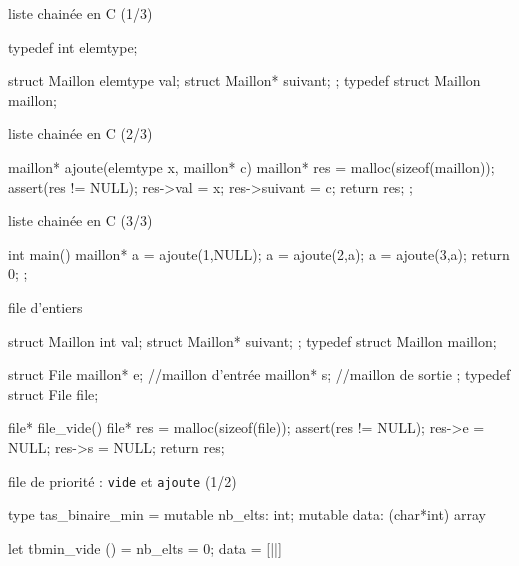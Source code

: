 \begin{adjustwidth}{-3cm}{-3cm}
\begin{implementation}{liste chainée en C (1/3)}
    \begin{lstC}
    typedef int elemtype;

    struct Maillon{
        elemtype val;
        struct Maillon* suivant;
    };
    typedef struct Maillon maillon;

    \end{lstC}
\end{implementation}

\begin{implementation}{liste chainée en C (2/3)}
    \begin{lstC}
    maillon* ajoute(elemtype x, maillon* c){
        maillon* res = malloc(sizeof(maillon));
        assert(res != NULL);
        res->val = x;
        res->suivant = c;
        return res;
    };
    \end{lstC}
\end{implementation}

\begin{implementation}{liste chainée en C (3/3)}
    \begin{lstC}
    int main(){
        maillon* a = ajoute(1,NULL);
        a = ajoute(2,a);
        a = ajoute(3,a);
        return 0;
    };
    \end{lstC}
\end{implementation}

\begin{implementation}{file d'entiers}
    \begin{lstC}
    struct Maillon{
        int val;
        struct Maillon* suivant;
    };
    typedef struct Maillon maillon;

    struct File{
        maillon* e; //maillon d'entrée
        maillon* s; //maillon de sortie
    };
    typedef struct File file;

    file* file_vide(){
        file* res = malloc(sizeof(file));
        assert(res != NULL);
        res->e = NULL;
        res->s = NULL;
        return res;
    }
    \end{lstC}
\end{implementation}

\begin{implementation}{file de priorité : \texttt{vide} et \texttt{ajoute} (1/2) }
    \begin{lstOCaml}
    type tas_binaire_min = {
        mutable nb_elts: int; 
        mutable data: (char*int) array
    }

    let tbmin_vide () = {nb_elts = 0; data = [||]}


\end{lstOCaml}
\end{implementation}
\end{adjustwidth}
